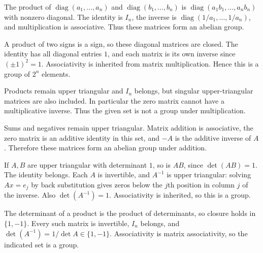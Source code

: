 
The product of $\operatorname{diag}(a_1,\ldots,a_n)$ and $\operatorname{diag}(b_1,\ldots,b_n)$ is $\operatorname{diag}(a_1b_1,\ldots,a_nb_n)$ with nonzero diagonal. The identity is $I_n$, the inverse is $\operatorname{diag}(1/a_1,\ldots,1/a_n)$, and multiplication is associative. Thus these matrices form an abelian group.


A product of two signs is a sign, so these diagonal matrices are closed. The identity has all diagonal entries $1$, and each matrix is its own inverse since $(\pm1)^2=1$. Associativity is inherited from matrix multiplication. Hence this is a group of $2^n$ elements.


Products remain upper triangular and $I_n$ belongs, but singular upper-triangular matrices are also included. In particular the zero matrix cannot have a multiplicative inverse. Thus the given set is not a group under multiplication.


Sums and negatives remain upper triangular. Matrix addition is associative, the zero matrix is an additive identity in this set, and $-A$ is the additive inverse of $A$. Therefore these matrices form an abelian group under addition.


If $A,B$ are upper triangular with determinant $1$, so is $AB$, since $\det(AB)=1$. The identity belongs. Each $A$ is invertible, and $A^{-1}$ is upper triangular: solving $Ax=e_j$ by back substitution gives zeros below the $j$th position in column $j$ of the inverse. Also $\det(A^{-1})=1$. Associativity is inherited, so this is a group.


The determinant of a product is the product of determinants, so closure holds in $\{1,-1\}$. Every such matrix is invertible, $I_n$ belongs, and $\det(A^{-1})=1/\det A\in\{1,-1\}$. Associativity is matrix associativity, so the indicated set is a group.


